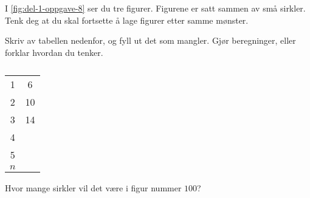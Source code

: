I \cref{fig:del-1-oppgave-8} ser du tre figurer. Figurene er satt sammen av små
sirkler. Tenk deg at du skal fortsette å lage figurer etter samme mønster.

\begin{oppgaver}
     Skriv av tabellen nedenfor, og fyll ut det som mangler. Gjør
    beregninger, eller forklar hvordan du tenker.
\end{oppgaver}

\begin{table}[H]
  \centering
  \caption{}
  \begin{tabular}{| S[table-format=1.0] | S[table-format=2.0] |}
    1   &  6 \\
    2   & 10 \\
    3   & 14 \\
    4   &    \\
    5   &    \\
    {$n$} &    \\ \hline
  \end{tabular}
  \label{tab:del-1-oppgave-1.8}
\end{table}

\begin{oppgaver}
     Hvor mange sirkler vil det være i figur nummer $100$?
\end{oppgaver}

